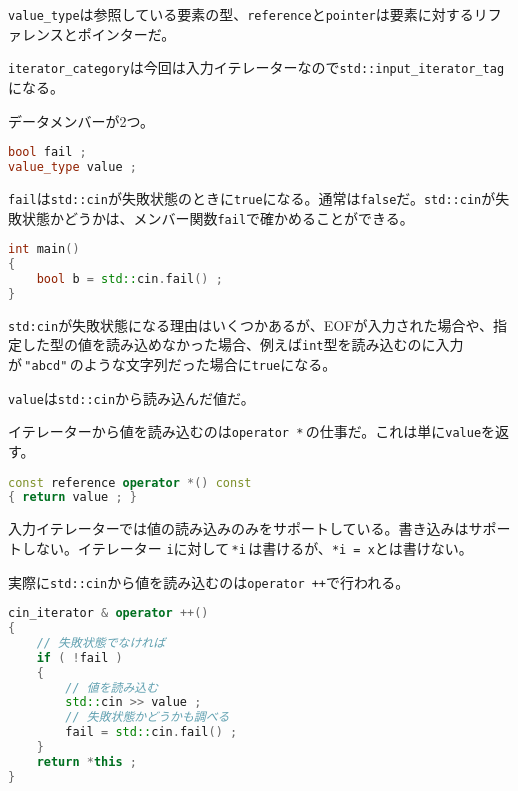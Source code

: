 \texttt{value\_type}は参照している要素の型、\texttt{reference}と\texttt{pointer}は要素に対するリファレンスとポインターだ。

\texttt{iterator\_category}は今回は入力イテレーターなので\texttt{std::input\_iterator\_tag}になる。

データメンバーが2つ。

\begin{lstlisting}[language={C++}]
bool fail ;
value_type value ;
\end{lstlisting}

\texttt{fail}は\texttt{std::cin}が失敗状態のときに\texttt{true}になる。通常は\texttt{false}だ。\texttt{std::cin}が失敗状態かどうかは、メンバー関数\texttt{fail}で確かめることができる。

\begin{lstlisting}[language={C++}]
int main()
{
    bool b = std::cin.fail() ;
}
\end{lstlisting}

\texttt{std:cin}が失敗状態になる理由はいくつかあるが、EOFが入力された場合や、指定した型の値を読み込めなかった場合、例えば\texttt{int}型を読み込むのに入力が\,\texttt{"abcd"}\,のような文字列だった場合に\texttt{true}になる。

\texttt{value}は\texttt{std::cin}から読み込んだ値だ。

イテレーターから値を読み込むのは\texttt{operator *}\,の仕事だ。これは単に\texttt{value}を返す。

\ifTombow\pagebreak\fi
\begin{lstlisting}[language={C++}]
const reference operator *() const
{ return value ; }
\end{lstlisting}

入力イテレーターでは値の読み込みのみをサポートしている。書き込みはサポートしない。イテレーター \texttt{i}に対して\,\texttt{*i}\,は書けるが、\texttt{*i = x}とは書けない。

実際に\texttt{std::cin}から値を読み込むのは\texttt{operator ++}で行われる。

\begin{lstlisting}[language={C++}]
cin_iterator & operator ++()
{
    // 失敗状態でなければ
    if ( !fail )
    {
        // 値を読み込む
        std::cin >> value ;
        // 失敗状態かどうかも調べる
        fail = std::cin.fail() ;
    }
    return *this ;
}
\end{lstlisting}

